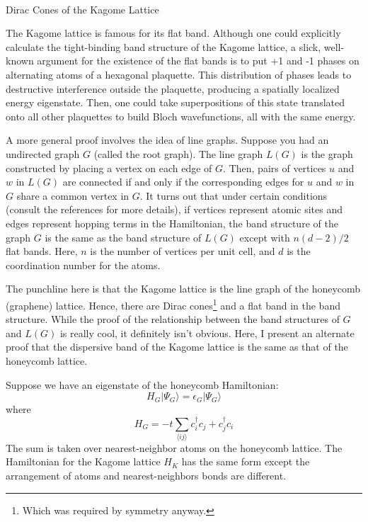 \documentclass[a4paper,12pt]{article}
\begin{document}

\begin{center}
\mbox{} \\
{ \large Dirac Cones of the Kagome Lattice}
\end{center}

\doublespacing

The Kagome lattice is famous for its flat band.  Although one could explicitly calculate the tight-binding band structure of the Kagome lattice, a slick, well-known argument for the existence of the flat bands is to put +1 and -1 phases on alternating atoms of a hexagonal plaquette.  This distribution of phases leads to destructive interference outside the plaquette, producing a spatially localized energy eigenstate.  Then, one could take superpositions of this state translated onto all other plaquettes to build Bloch wavefunctions, all with the same energy.

A more general proof involves the idea of line graphs.  Suppose you had an undirected graph $G$ (called the root graph). The line graph $L(G)$ is the graph constructed by placing a vertex on each edge of $G$.  Then, pairs of vertices $u$ and $w$ in $L(G)$ are connected if and only if the corresponding edges for $u$ and $w$ in $G$ share a common vertex in $G$.  It turns out that under certain conditions (consult the references for more details), if vertices represent atomic sites and edges represent hopping terms in the Hamiltonian, the band structure of the graph $G$ is the same as the band structure of $L(G)$ except with $n(d-2)/2$ flat bands.  Here, $n$ is the number of vertices per unit cell, and $d$ is the coordination number for the atoms.

The punchline here is that the Kagome lattice is the line graph of the honeycomb (graphene) lattice.  Hence, there are Dirac cones\footnote{Which was required by symmetry anyway.} and a flat band in the band structure.  While the proof of the relationship between the band structures of $G$ and $L(G)$ is really cool, it definitely isn't obvious.  Here, I present an alternate proof that the dispersive band of the Kagome lattice is the same as that of the honeycomb lattice.

Suppose we have an eigenstate of the honeycomb Hamiltonian:
\begin{equation}
\label{eq:schro_graphene}
H_G | \Psi_G \rangle = \epsilon_G | \Psi_G \rangle
\end{equation}
where
\begin{equation}
H_G = -t \sum_{\langle ij \rangle} c_i^\dagger c_j +  c_j^\dagger c_i
\end{equation}
The sum is taken over nearest-neighbor atoms on the honeycomb lattice.  The Hamiltonian for the Kagome lattice $H_K$ has the same form except the arrangement of atoms and nearest-neighbors bonds are different.
\end{document}
